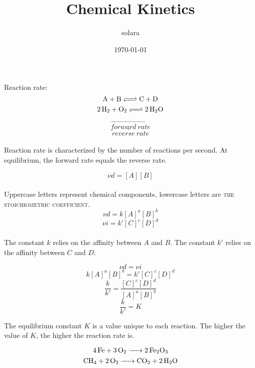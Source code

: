 \documentclass{article}
\title{Chemical Kinetics}
\author{solara}
\date{\today}
\begin{document}
\maketitle
Reaction rate:
$$\ce{A + B <=> C + D}$$
$$\ce{2H2 + O2 <=> 2H2O}$$

$$\overrightarrow{forward\ rate}$$
$$\overleftarrow{reverse\ rate}$$\\
Reaction rate is characterized by the number of reactions per second. At equilibrium, the forward rate equals the reverse rate.

$$\nu d = [A][B]$$\\
Uppercase letters represent chemical components, lowercase letters are \textsc{the stoichiometric coefficient}.
$$\nu d = k[A]^a[B]^b$$
$$\nu i = k'[C]^c[D]^d$$\\
The constant $k$ relies on the affinity between $A$ and $B$.
The constant $k'$ relies on the affinity between $C$ and $D$.

$$\nu d = \nu i$$
$$k[A]^a[B]^b = k'[C]^c[D]^d$$
$$\frac{k}{k'} = \frac{[C]^c[D]^d}{[A]^a[B]^b}$$
$$\frac{k}{k'} = K$$

The equilibrium constant $K$ is a value unique to each reaction. The higher the value of $K$, the higher the reaction rate is.

$$\ce{4Fe + 3O2 -> 2Fe2O3}$$
$$\ce{CH4 + 2O2 -> CO2 + 2H2O}$$
\end{document}
